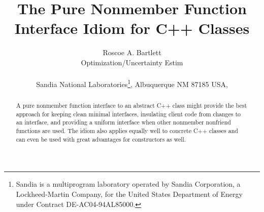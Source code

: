 \documentclass[pdf,ps2pdf,11pt]{SANDreport}
\title{\center
The Pure Nonmember Function Interface Idiom for C++ Classes}
\author{
Roscoe A. Bartlett \\ Optimization/Uncertainty Estim \\ \\ Sandia National
Laboratories\footnote{ Sandia is a multiprogram laboratory operated by Sandia
Corporation, a Lockheed-Martin Company, for the United States Department of
Energy under Contract DE-AC04-94AL85000.}, Albuquerque NM 87185 USA, \\ }
\date{}
\begin{document}
\maketitle

%

%
\begin{abstract}
%
A pure nonmember function interface to an abstract C++ class might provide the
best approach for keeping clean minimal interfaces, insulating client code
from changes to an interface, and providing a uniform interface when other
nonmember nonfriend functions are used.  The idiom also applies equally well
to concrete C++ classes and can even be used with great advantages for
constructors as well.
%
\end{abstract}
%

%
%
%

%
\clearpage
\tableofcontents


\end{document}
